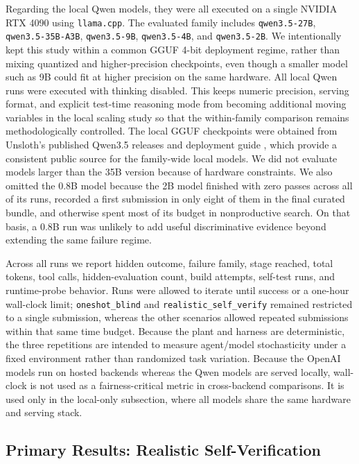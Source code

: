 \documentclass[a4paper,fleqn]{cas-dc}
\DeclareRobustCommand{\tool}[1]{\texttt{\nolinkurl{#1}}}
\begin{document}
Regarding the local Qwen models, they were all executed on a single NVIDIA RTX 4090 using \tool{llama.cpp}. The evaluated family includes \tool{qwen3.5-27B}, \tool{qwen3.5-35B-A3B}, \tool{qwen3.5-9B}, \tool{qwen3.5-4B}, and \tool{qwen3.5-2B}. We intentionally kept this study within a common GGUF 4-bit deployment regime, rather than mixing quantized and higher-precision checkpoints, even though a smaller model such as 9B could fit at higher precision on the same hardware. All local Qwen runs were executed with thinking disabled. This keeps numeric precision, serving format, and explicit test-time reasoning mode from becoming additional moving variables in the local scaling study so that the within-family comparison remains methodologically controlled. The local GGUF checkpoints were obtained from Unsloth's published Qwen3.5 releases and deployment guide \cite{unsloth_qwen35}, which provide a consistent public source for the family-wide local models. We did not evaluate models larger than the 35B version because of hardware constraints. We also omitted the 0.8B model because the 2B model finished with zero passes across all of its runs, recorded a first submission in only eight of them in the final curated bundle, and otherwise spent most of its budget in nonproductive search. On that basis, a 0.8B run was unlikely to add useful discriminative evidence beyond extending the same failure regime.

Across all runs we report hidden outcome, failure family, stage reached, total tokens, tool calls, hidden-evaluation count, build attempts, self-test runs, and runtime-probe behavior. Runs were allowed to iterate until success or a one-hour wall-clock limit; \tool{oneshot_blind} and \tool{realistic_self_verify} remained restricted to a single submission, whereas the other scenarios allowed repeated submissions within that same time budget. Because the plant and harness are deterministic, the three repetitions are intended to measure agent/model stochasticity under a fixed environment rather than randomized task variation. Because the OpenAI models run on hosted backends whereas the Qwen models are served locally, wall-clock is not used as a fairness-critical metric in cross-backend comparisons. It is used only in the local-only subsection, where all models share the same hardware and serving stack.

\subsection{Primary Results: Realistic Self-Verification}
\end{document}
